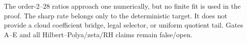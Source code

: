 \documentclass[11pt]{article}
\begin{document}
The order-2--28 ratios approach one numerically, but no finite fit is used in
the proof.  The sharp rate belongs only to the deterministic target.  It does
not provide a cloud coefficient bridge, legal selector, or uniform quotient
tail.  Gates A--E and all Hilbert--Polya/zeta/RH claims remain false/open.


\end{document}
